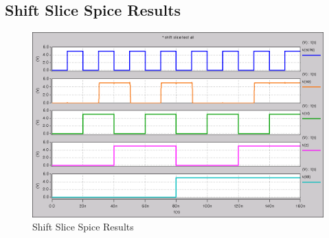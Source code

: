     \newpage
    \subsection{Shift Slice Spice Results}
        
        \begin{figure}[H]
            \centering
            \includegraphics[width=0.75\linewidth]{../../spice/shift_slice_all.png}
            \caption{Shift Slice Spice Results}
        \end{figure}


    \newpage

